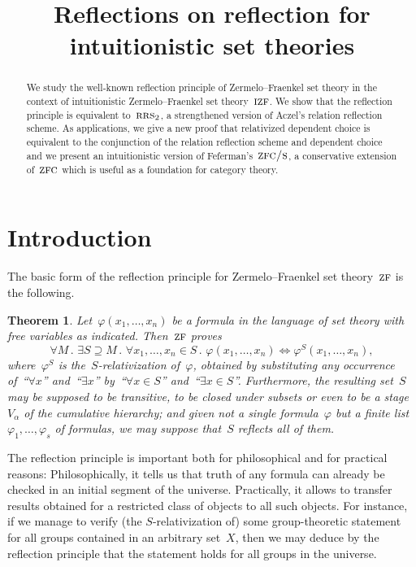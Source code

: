 \documentclass[oneside,reqno]{amsart}
\title[]{Reflections on reflection for \\ intuitionistic set theories}
\author{}
\theoremstyle{definition}
\theoremstyle{plain}
\newtheorem{thm}[defn]{Theorem}
\theoremstyle{remark}
\renewcommand{\_}{\mathpunct{.}\,}
\newcommand{\?}{\,{:}\,}
\newcommand{\ZF}{\textsc{zf}}
\newcommand{\IZF}{\textsc{izf}}
\newcommand{\ZFC}{\textsc{zfc}}
\newcommand{\ZFCS}{\textsc{zfc/s}}
\newcommand{\RRS}{\textsc{rrs}}
\begin{document}
\begin{abstract}
  We study the well-known reflection principle of Zermelo--Fraenkel set theory
  in the context of intuitionistic Zermelo--Fraenkel set theory~$\IZF$. We show
  that the reflection principle is equivalent to~$\RRS_2$, a strengthened
  version of Aczel's relation reflection scheme. As
  applications, we give a new proof that relativized dependent choice is
  equivalent to the conjunction of the relation reflection scheme and dependent
  choice and we present an intuitionistic version of Feferman's~$\ZFCS$, a
  conservative extension of~$\ZFC$ which is useful as a foundation for category
  theory.
\end{abstract}

\maketitle
\thispagestyle{empty}

\section{Introduction}

The basic form of the reflection principle for Zermelo--Fraenkel set
theory~$\ZF$ is the following.
\begin{thm}Let~$\varphi(x_1,\ldots,x_n)$ be a formula in the language of set
theory with free variables as indicated. Then~$\ZF$ proves
\[ \forall M\_
  \exists S \supseteq M\_
  \forall x_1,\ldots,x_n \in S\_
  \varphi(x_1,\ldots,x_n) \Leftrightarrow \varphi^S(x_1,\ldots,x_n), \]
where~$\varphi^S$ is the~$S$-relativization of~$\varphi$, obtained by
substituting any occurrence of~``$\forall x$'' and~``$\exists x$'' by~``$\forall
x \in S$'' and~``$\exists x \in S$''.
Furthermore, the resulting set~$S$ may be supposed to be transitive, to be closed
under subsets or even to be a stage~$V_\alpha$ of the cumulative hierarchy;
and given not a single formula~$\varphi$ but a finite
list~$\varphi_1,\ldots,\varphi_s$ of formulas, we may suppose that~$S$ reflects
all of them.
\end{thm}

The reflection principle is important both for philosophical and for practical
reasons: Philosophically, it tells us that truth of any formula can already be
checked in an initial segment of the universe. Practically, it allows to
transfer results obtained for a restricted class of objects to all such
objects. For instance, if we manage to verify (the $S$-relativization of) some
group-theoretic statement for all groups contained in an arbitrary set~$X$,
then we may deduce by the reflection principle that the statement holds
for all groups in the universe.
\end{document}
